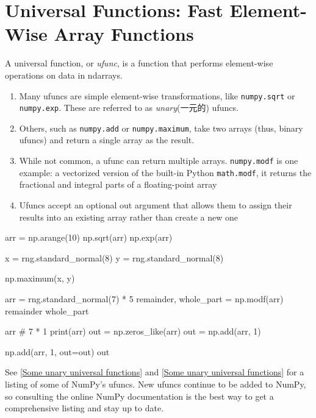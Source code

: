 \section{Universal Functions: Fast Element-Wise Array Functions}
A universal function, or \emph{ufunc}, is a function that performs element-wise operations
on data in ndarrays.
\begin{enumerate}
    \item Many ufuncs are simple element-wise transformations, like \verb|numpy.sqrt| or \verb|numpy.exp|. These are referred to as \emph{unary}(一元的) ufuncs.
    \item Others, such as \verb|numpy.add| or \verb|numpy.maximum|, take two arrays (thus, binary ufuncs) and return a single array as the result.
    \item While not common, a ufunc can return multiple arrays. \verb|numpy.modf| is one example: a vectorized version of the built-in Python \verb|math.modf|, it returns the fractional and integral parts of a floating-point array
    \item Ufuncs accept an optional out argument that allows them to assign their results into an existing array rather than create a new one
\end{enumerate}
\begin{pyc}
arr = np.arange(10)
np.sqrt(arr)
np.exp(arr)

x = rng.standard_normal(8)
y = rng.standard_normal(8)

np.maximum(x, y)

arr = rng.standard_normal(7) * 5
remainder, whole_part = np.modf(arr)
remainder
whole_part

arr
# 7 * 1
print(arr)
out = np.zeros_like(arr)
out = np.add(arr, 1)

np.add(arr, 1, out=out)
out
\end{pyc}

See \autoref{Some unary universal functions} and \autoref{Some unary universal functions} for a listing of some of NumPy's ufuncs. New ufuncs continue to be added to NumPy, so consulting the online NumPy documentation is the best way to get a comprehensive listing and stay up to date.

